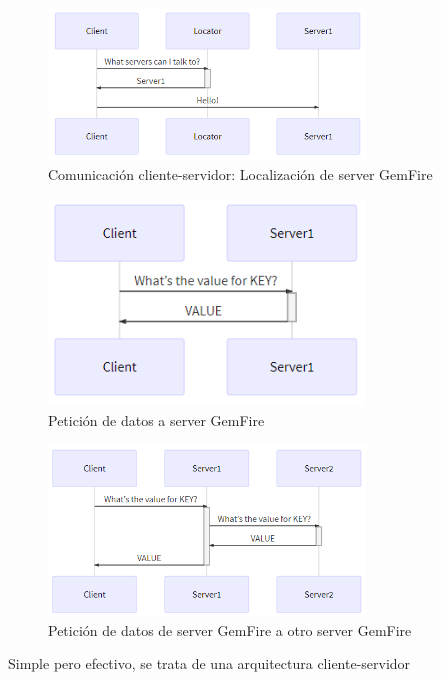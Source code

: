 \documentclass[a4paper,11pt]{article}
\begin{document}
\begin{figure}[H]
    \centering
    \includegraphics[width=0.75\textwidth]{fran2_6.png}
    \caption{Comunicación cliente-servidor: Localización de server GemFire}
    \label{fig:fran2_6}
\end{figure}
\begin{figure}[H]
    \centering
    \includegraphics[width=0.75\textwidth]{fran2_7.png}
    \caption{Petición de datos a server GemFire}
    \label{fig:fran2_7}
\end{figure}
\begin{figure}[H]
    \centering
    \includegraphics[width=0.75\textwidth]{fran2_8.png}
    \caption{Petición de datos de server GemFire a otro server GemFire}
    \label{fig:fran2_8}
\end{figure}

Simple pero efectivo, se trata de una arquitectura cliente-servidor
\end{document}

